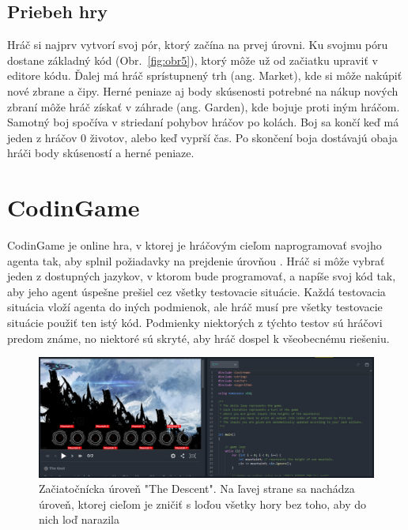 \documentclass[slovak,a4paper,10pt]{article}
\begin{document}
\subsection{Priebeh hry}
Hráč si najprv vytvorí svoj pór, ktorý začína na prvej úrovni. Ku svojmu póru dostane základný kód (Obr.~\ref{fig:obr5}), ktorý môže už od začiatku upraviť v editore kódu. Ďalej má hráč sprístupnený trh (ang. Market), kde si môže nakúpiť nové zbrane a čipy. Herné peniaze aj body skúsenosti potrebné na nákup nových zbraní môže hráč získať v záhrade (ang. Garden), kde bojuje proti iným hráčom. \\
Samotný boj spočíva v striedaní pohybov hráčov po kolách. Boj sa končí keď má jeden z hráčov 0 životov, alebo keď vyprší čas. Po skončení boja dostávajú obaja hráči body skúseností a herné peniaze.

\section{CodinGame}
CodinGame je online hra, v ktorej je hráčovým cieľom naprogramovať svojho agenta tak, aby splnil požiadavky na prejdenie úrovňou \cite{combefis2016learning}. Hráč si môže vybrať jeden z dostupných jazykov, v ktorom bude programovať, a napíše svoj kód tak, aby jeho agent úspešne prešiel cez všetky testovacie situácie. Každá testovacia situácia vloží agenta do iných podmienok, ale hráč musí pre všetky testovacie situácie použiť ten istý kód. Podmienky niektorých z týchto testov sú hráčovi predom známe, no niektoré sú skryté, aby hráč dospel k všeobecnému riešeniu.\\
\begin{figure}[h]
\includegraphics[scale=0.28]{codingamemain}
\centering
\caption{Začiatočnícka úroveň "The Descent". Na ľavej strane sa nachádza úroveň, ktorej cieľom je zničiť s loďou všetky hory bez toho, aby do nich loď narazila}
\label{fig:obr6}
\end{figure}
\end{document}
